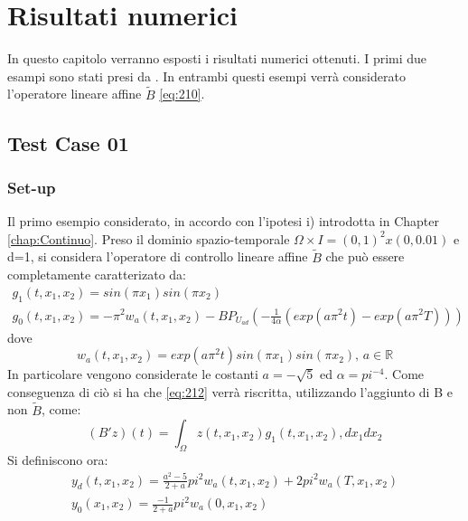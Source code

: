\section{Risultati numerici}
\label{chap:Results}
In questo capitolo verranno esposti i risultati numerici ottenuti.
I primi due esampi sono stati presi da \cite{MAIN}.
In entrambi questi esempi verrà considerato l'operatore lineare affine $\tilde{B}$ \ref{eq:210}.

\subsection{Test Case 01}
\subsubsection{Set-up}
Il primo esempio considerato, in accordo con l'ipotesi i) introdotta in Chapter \ref{chap:Continuo}.
Preso il dominio spazio-temporale $\Omega \times I = (0,1)^2 x(0,0.01)$ e d=1, si considera l'operatore di controllo lineare affine $\tilde{B}$ che può essere completamente caratterizato da:
{\renewcommand\arraystretch{2}
\begin{equation}
\begin{array}{c}
g_1(t,x_1,x_2) = sin({\pi}x_1)sin({\pi}x_2)\\
g_0(t,x_1,x_2) = -{\pi}^2w_a(t,x_1,x_2) - BP_{U_{ad}} \left( -\frac{1}{4\alpha}(exp(a{\pi}^2t)-exp(a{\pi}^2T)) \right)
\end{array}
\label{eq:500}
\end{equation}
}
dove
\begin{equation}
w_a(t,x_1,x_2) = exp(a{\pi}^2t)sin({\pi}x_1)sin({\pi}x_2) \text{, } a \in \mathbb{R}
\label{eq:501}
\end{equation}
In particolare vengono considerate le costanti $a=-\sqrt{5}$ ed $\alpha={pi}^{-4}$.
Come conseguenza di ciò si ha che \ref{eq:212} verrà riscritta, utilizzando l'aggiunto di B e non $\tilde{B}$, come:
\begin{equation}
(B'z)(t) = \int_{\Omega} z(t,x_1,x_2)g_1(t,x_1,x_2) ,dx_1dx_2
\label{eq:502}
\end{equation}
Si definiscono ora:
{\renewcommand\arraystretch{2}
\begin{equation}
\begin{array}{c}
y_d(t,x_1,x_2) = \frac{a^2 - 5}{2 + a}{pi}^2w_a(t,x_1,x_2) + 2{pi}^2w_a(T,x_1,x_2) \\
y_0(x_1,x_2) = \frac{- 1}{2 + a}{pi}^2w_a(0,x_1,x_2)
\end{array}
\label{eq:503}
\end{equation}
}
